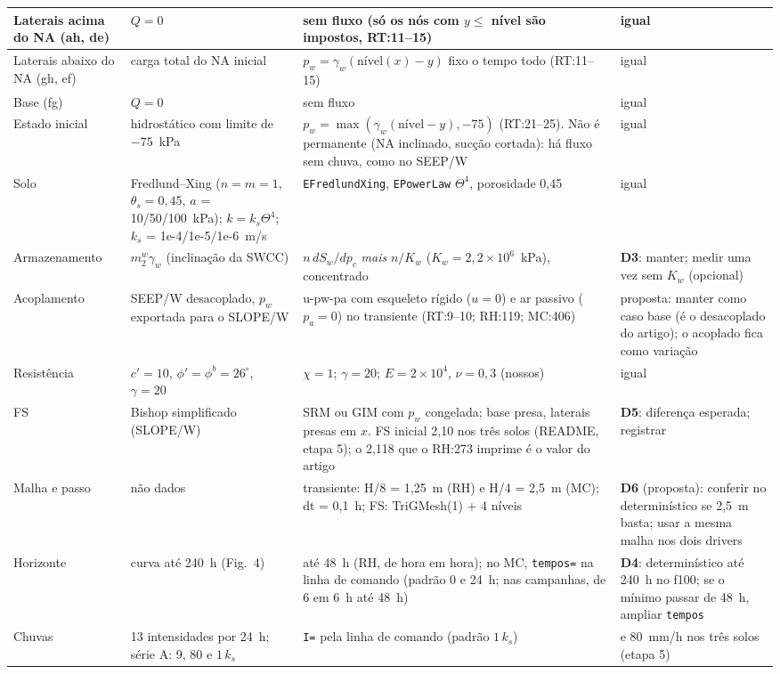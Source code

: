 \documentclass[11pt,a4paper]{article}
\newcommand{\gw}{\gamma_w}
\begin{document}
\begin{landscape}
\begin{longtable}{>{\raggedright}p{2.5cm}>{\raggedright}p{5.6cm}>{\raggedright}p{7.6cm}>{\raggedright\arraybackslash}p{6.9cm}}
Laterais acima do NA (ah, de) & $Q = 0$ & sem fluxo (só os nós com $y \le$ nível são impostos, RT:11--15) & igual \\ \midrule
Laterais abaixo do NA (gh, ef) & carga total do NA inicial & $p_w = \gw(\text{nível}(x) - y)$ fixo o tempo todo
  (RT:11--15) & igual \\ \midrule
Base (fg) & $Q = 0$ & sem fluxo & igual \\ \midrule
Estado inicial & hidrostático com limite de $-75$~kPa & $p_w = \max(\gw(\text{nível} - y), -75)$ (RT:21--25). Não
  é permanente (NA inclinado, sucção cortada): há fluxo sem chuva, como no SEEP/W & igual \\ \midrule
Solo & Fredlund--Xing ($n = m = 1$, $\theta_s = 0{,}45$, $a$ = 10/50/100~kPa); $k = k_s\Theta^4$;
  $k_s$ = 1e-4/1e-5/1e-6~m/s & \texttt{EFredlundXing}, \texttt{EPowerLaw} $\Theta^4$, porosidade 0,45 & igual \\ \midrule
Armazenamento & $m_2^w\gw$ (inclinação da SWCC) & $n\,dS_w/dp_c$ \emph{mais} $n/K_w$ ($K_w = 2{,}2\times10^6$~kPa),
  concentrado & \textbf{D3}: manter; medir uma vez sem $K_w$ (opcional) \\ \midrule
Acoplamento & SEEP/W desacoplado, $p_w$ exportada para o SLOPE/W &
  u-pw-pa com esqueleto rígido ($u = 0$) e ar passivo ($p_a = 0$) no transiente (RT:9--10; RH:119; MC:406) &
  proposta: manter como caso base (é o desacoplado do artigo); o acoplado fica como variação \\ \midrule
Resistência & $c' = 10$, $\phi' = \phi^b = 26^\circ$, $\gamma = 20$ & $\chi = 1$; $\gamma = 20$; $E = 2\times10^4$,
  $\nu = 0{,}3$ (nossos) & igual \\ \midrule
FS & Bishop simplificado (SLOPE/W) & SRM ou GIM com $p_w$ congelada; base presa, laterais presas em $x$.
  FS inicial 2,10 nos três solos (README, etapa 5); o 2,118 que o RH:273 imprime é o valor do artigo & \textbf{D5}: diferença esperada; registrar \\ \midrule
Malha e passo & não dados & transiente: H/8 = 1,25~m (RH) e H/4 = 2,5~m (MC); dt = 0,1~h; FS: TriGMesh(1) + 4 níveis
  & \textbf{D6} (proposta): conferir no determinístico se 2,5~m basta; usar a mesma malha nos dois drivers \\ \midrule
Horizonte & curva até 240~h (Fig.~4) & até 48~h (RH, de hora em hora); no MC, \texttt{tempos=} na linha de comando (padrão 0 e 24~h; nas campanhas, de
  6 em 6~h até 48~h) &
  \textbf{D4}: determinístico até 240~h no f100; se o mínimo passar de 48~h, ampliar \texttt{tempos} \\ \midrule
Chuvas & 13 intensidades por 24~h; série A: 9, 80 e $1\,k_s$ & \texttt{I=} pela linha de comando (padrão $1\,k_s$) &
  9 e 80~mm/h nos três solos (etapa 5) \\
\end{longtable}
\end{landscape}
\end{document}
